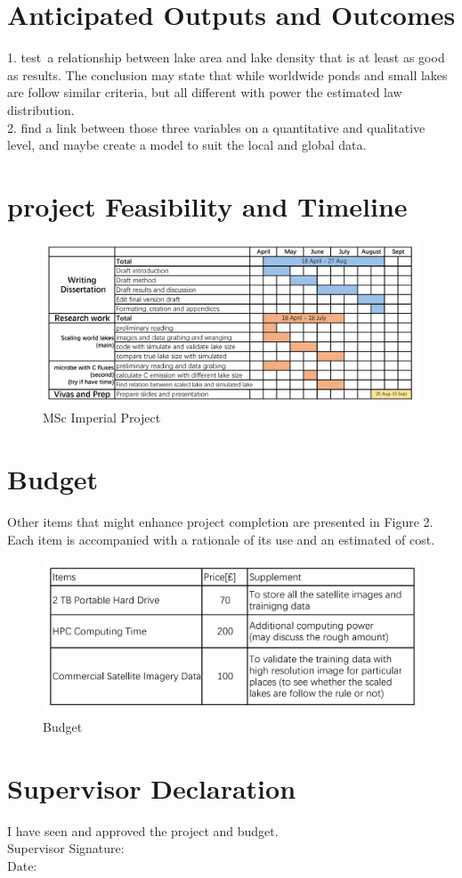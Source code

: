 \section{Anticipated Outputs and Outcomes}
1. test a relationship between lake area and lake density that is at least as good as \cite{cael2016size} results. The conclusion may state that while worldwide ponds and small lakes are follow similar criteria, but all different with power the estimated law distribution. 
\\
2. find a link between those three variables on a quantitative and qualitative level, and maybe create a model to suit the local and global data.


\section{project Feasibility and Timeline}
\begin{figure}[H]
    \centering
    \includegraphics[scale=0.4]{introduction/Figure1.png}
    \caption{MSc Imperial Project}
    \label{Fig.1}
\end{figure}

\section{Budget}
Other items that might enhance project completion are presented in Figure 2. Each item is accompanied with a rationale of its use and an estimated of cost. 

\begin{figure}[H]
    \centering
    \includegraphics[scale=0.3]{introduction/Figure2.png}
    \caption{Budget}
    \label{Fig.2}
\end{figure}

\section{Supervisor Declaration}
\large{I have seen and approved the project and budget.}
\\
\large{Supervisor Signature:}     
\\
\large{Date:}

